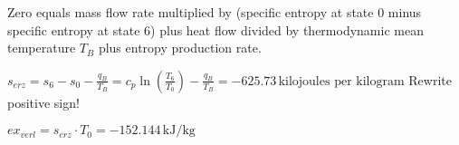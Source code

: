 Zero equals mass flow rate multiplied by (specific entropy at state 0 minus specific entropy at state 6) plus heat flow divided by thermodynamic mean temperature \( T_B \) plus entropy production rate.  

\( s_{erz} = s_6 - s_0 - \frac{q_B}{T_B} = c_p \ln \left( \frac{T_6}{T_0} \right) - \frac{q_B}{T_B} = -625.73 \, \text{kilojoules per kilogram} \)  
Rewrite positive sign!  

\( ex_{verl} = s_{erz} \cdot T_0 = -152.144 \, \text{kJ/kg} \)